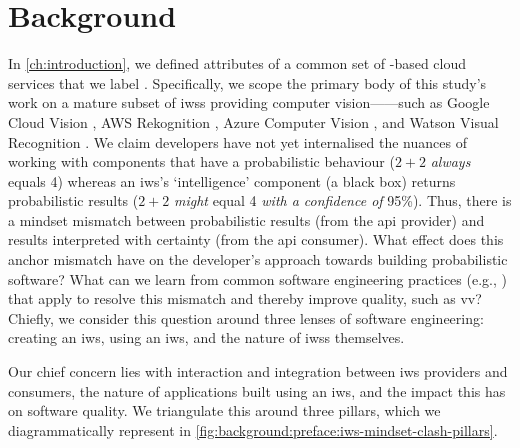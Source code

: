 \chapter{Background}
\label{ch:background}

\graphicspath{{mainmatter/background/figures/}}

\label{sec:background:preface}

In \cref{ch:introduction}, we defined attributes of a common set of -based cloud services that we label . Specifically, we scope the primary body of this study's work on a mature subset of \glspl{iws} providing computer vision------such as Google Cloud Vision , AWS Rekognition , Azure Computer Vision , and Watson Visual Recognition . We claim developers have not yet internalised the nuances of working with components that have a probabilistic behaviour ($2+2$ \textit{always} equals 4) whereas an \gls{iws}'s `intelligence' component (a black box) returns probabilistic results ($2+2$ \textit{might} equal 4 \textit{with a confidence of} 95\%). Thus, there is a mindset mismatch between probabilistic results (from the \gls{api} provider) and results interpreted with certainty (from the \gls{api} consumer).
What effect does this anchor mismatch have on the developer's approach towards building probabilistic software? What can we learn from common software engineering practices (e.g., \citep{Pressman:2005vf,Sommerville:2011uc}) that apply to resolve this mismatch and thereby improve quality, such as \gls{vv}? Chiefly, we consider this question around three lenses of software engineering: creating an \gls{iws}, using an \gls{iws}, and the nature of \glspl{iws} themselves.

Our chief concern lies with interaction and integration between \gls{iws} providers and consumers, the nature of applications built using an \gls{iws}, and the impact this has on software quality. We triangulate this around three pillars, which we diagrammatically represent in \cref{fig:background:preface:iws-mindset-clash-pillars}.
 
